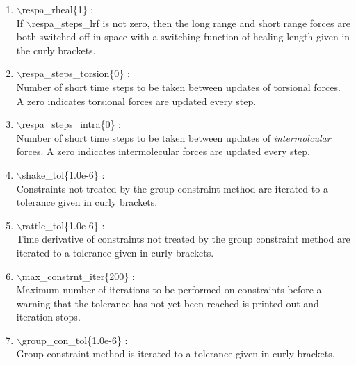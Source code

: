 \begin{itemize}
\begin{enumerate}
 \vspace{0.15in} \Large
 \item   $\backslash$respa\_rheal\{1\} : \\
   \large
    If $\backslash$respa\_steps\_lrf is not zero, then the long range 
    and short range forces are both switched off in space with a switching
    function of healing length given in the curly brackets.

 \vspace{0.15in} \Large
 \item   $\backslash$respa\_steps\_torsion\{0\} : \\
   \large
    Number of short time steps to be taken between updates of torsional
    forces.  A zero indicates torsional forces are updated every step.

 \vspace{0.15in} \Large
  \item   $\backslash$respa\_steps\_intra\{0\} : \\
   \large
    Number of short time steps to be taken between updates of 
    {\it intermolcular} forces.  A zero indicates intermolecular forces are 
    updated every step.

 \vspace{0.15in} \Large
 \item   $\backslash$shake\_tol\{1.0e-6\} : \\
    \large
     Constraints not treated by the group constraint method are iterated to a
     tolerance given in curly brackets.


 \vspace{0.15in} \Large
 \item   $\backslash$rattle\_tol\{1.0e-6\} : \\
    \large
      Time derivative of constraints not treated by the group constraint 
      method are iterated to a tolerance given in curly brackets.


 \vspace{0.15in} \Large
 \item   $\backslash$max\_constrnt\_iter\{200\} : \\
    \large
     Maximum number of iterations to be performed on constraints before a 
     warning that the tolerance has not yet been reached is printed out and 
     iteration stops.

 \vspace{0.15in} \Large
 \item   $\backslash$group\_con\_tol\{1.0e-6\} : \\
    \large
     Group constraint method is iterated to a tolerance given in curly 
     brackets.


\end{enumerate}
\end{itemize}
